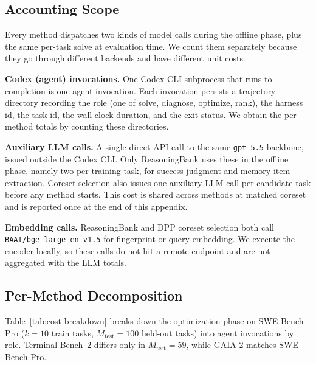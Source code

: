 \subsection{Accounting Scope}

Every method dispatches two kinds of model calls during the offline phase, plus the same per-task solve at evaluation time.
We count them separately because they go through different backends and have different unit costs.

\noindent\textbf{Codex (agent) invocations.}
One Codex CLI subprocess that runs to completion is one agent invocation.
Each invocation persists a trajectory directory recording the role (one of solve, diagnose, optimize, rank), the harness id, the task id, the wall-clock duration, and the exit status.
We obtain the per-method totals by counting these directories.

\noindent\textbf{Auxiliary LLM calls.}
A single direct API call to the same \texttt{gpt-5.5} backbone, issued outside the Codex CLI.
Only ReasoningBank uses these in the offline phase, namely two per training task, for success judgment and memory-item extraction.
Coreset selection also issues one auxiliary LLM call per candidate task before any method starts. This cost is shared across methods at matched coreset and is reported once at the end of this appendix.

\noindent\textbf{Embedding calls.}
ReasoningBank and DPP coreset selection both call \texttt{BAAI/bge-large-en-v1.5} \citep{xiao2023cpack} for fingerprint or query embedding.
We execute the encoder locally, so these calls do not hit a remote endpoint and are not aggregated with the LLM totals.

\subsection{Per-Method Decomposition}

Table~\ref{tab:cost-breakdown} breaks down the optimization phase on SWE-Bench Pro ($k=10$ train tasks, $M_{\mathrm{test}}=100$ held-out tasks) into agent invocations by role.
Terminal-Bench~2 differs only in $M_{\mathrm{test}}=59$, while GAIA-2 matches SWE-Bench Pro.


